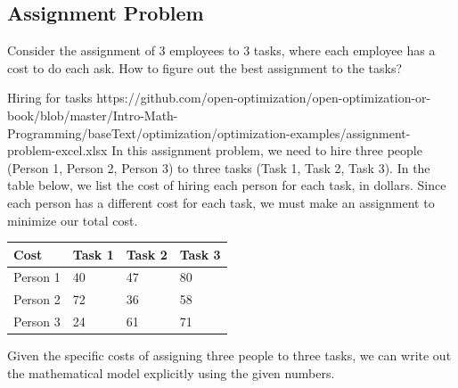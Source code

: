 \subsection{Assignment Problem}
Consider the assignment of $3$ employees to $3$ tasks, where each employee has a cost to do each ask.  How to figure out the best assignment to the tasks?


\begin{examplewithallcode}
{Hiring for tasks}
{https://github.com/open-optimization/open-optimization-or-book/blob/master/Intro-Math-Programming/baseText/optimization/optimization-examples/assignment-problem-excel.xlsx}
{}
{}
\label{example:hiring-for-tasks}
In this assignment problem, we need to hire three people (Person 1, Person 2, Person 3) to three tasks (Task 1, Task 2, Task 3).   In the table below, we list the cost of hiring each person for each task, in dollars.  Since each person has a different cost for each task, we must make an assignment to minimize our total cost.
    \begin{tabular}{llll}
    \hline
        Cost & Task 1 & Task 2 & Task 3  \\ \hline
        Person 1 & 40 & 47 & 80  \\ \hline
        Person 2 & 72 & 36 & 58  \\ \hline
        Person 3 & 24 & 61 & 71 \\ \hline
    \end{tabular}

Given the specific costs of assigning three people to three tasks, we can write out the mathematical model explicitly using the given numbers.
\end{examplewithallcode}
